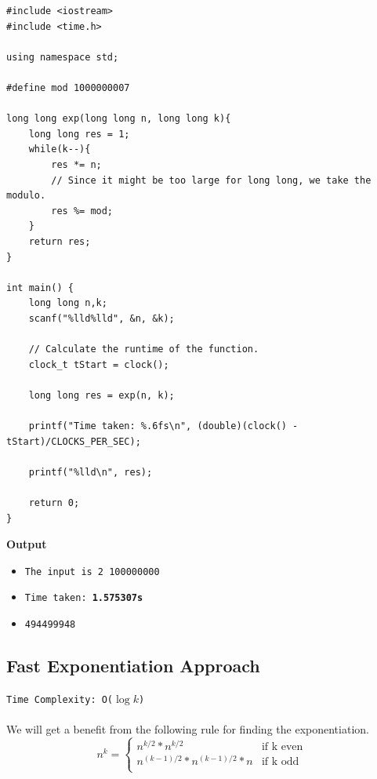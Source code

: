 \documentclass[12pt]{article}
\begin{document}
\begin{verbatim}
#include <iostream>
#include <time.h>

using namespace std;

#define mod 1000000007

long long exp(long long n, long long k){
    long long res = 1;
    while(k--){
        res *= n;
        // Since it might be too large for long long, we take the modulo.
        res %= mod;
    }
    return res;
}

int main() {
    long long n,k;
    scanf("%lld%lld", &n, &k);
    
    // Calculate the runtime of the function.
    clock_t tStart = clock();
    
    long long res = exp(n, k);
    
    printf("Time taken: %.6fs\n", (double)(clock() - tStart)/CLOCKS_PER_SEC);
    
    printf("%lld\n", res);
    
    return 0;
}

\end{verbatim}
\textbf{Output}

\begin{itemize}
  \item \texttt{The input is 2 100000000} 
  \item \texttt{Time taken: \textbf{1.575307s}} 
  \item \texttt{494499948}
\end{itemize}

\clearpage

\subsection{Fast Exponentiation Approach }
\texttt{Time Complexity: O($\log{k}$) } \\ \\
We will get a benefit from the following rule for finding the exponentiation.
\begin{equation}
  n^k =
  \begin{cases}
    n^{k/2} * n^{k/2} & \text{if k even } \\
    n^{(k-1)/2} * n^{(k-1)/2} * n & \text{if k odd } \\
  \end{cases}
\end{equation}
\end{document}
